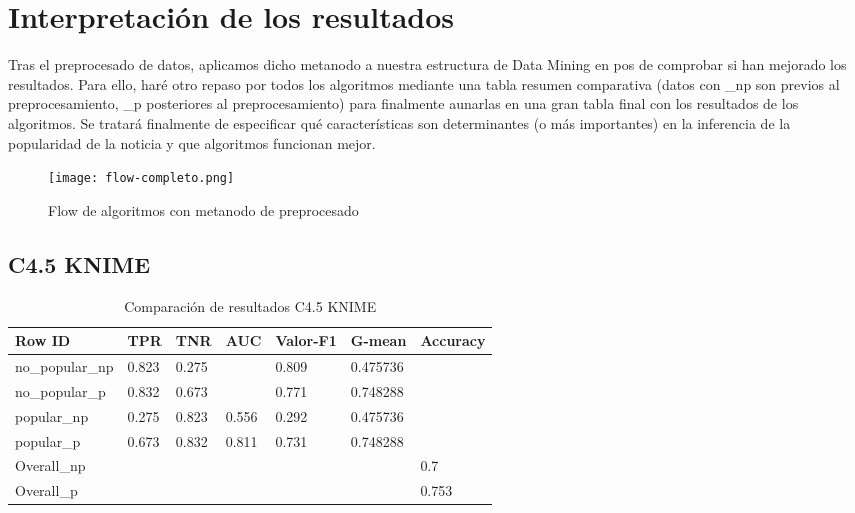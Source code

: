 \section{Interpretación de los resultados}

Tras el preprocesado de datos, aplicamos dicho metanodo a nuestra estructura de Data Mining en pos de comprobar si han mejorado los resultados. Para ello, haré otro repaso por todos los algoritmos mediante una tabla resumen comparativa (datos con \_np son previos al preprocesamiento, \_p posteriores al preprocesamiento) para finalmente aunarlas en una gran tabla final con los resultados de los algoritmos. Se tratará finalmente de especificar qué características son determinantes (o más importantes) en la inferencia de la popularidad de la noticia y que algoritmos funcionan mejor.


\begin{figure}[H] %
	\centering
	\texttt{[image: flow-completo.png]}  %
	\caption{Flow de algoritmos con metanodo de preprocesado} 
	\label{fig:flow-completo}
\end{figure}

\subsection{C4.5 KNIME}


\begin{table}[H]
	\centering
	\begin{tabular}{|l|l|l|l|l|l|l|}
		\hline
		Row ID          & TPR   & TNR   & AUC   & Valor-F1 & G-mean   & Accuracy \\ \hline
		no\_popular\_np & 0.823 & 0.275 &       & 0.809    & 0.475736 &          \\ \hline
		no\_popular\_p  & 0.832 & 0.673 &       & 0.771    & 0.748288 &          \\ \hline
		popular\_np     & 0.275 & 0.823 & 0.556 & 0.292    & 0.475736 &          \\ \hline
		popular\_p      & 0.673 & 0.832 & 0.811 & 0.731    & 0.748288 &          \\ \hline
		Overall\_np     &       &       &       &          &          & 0.7      \\ \hline
		Overall\_p      &       &       &       &          &          & 0.753    \\ \hline
	\end{tabular}
	\caption{Comparación de resultados C4.5 KNIME}
	\label{tab:compc4.5}
\end{table}

